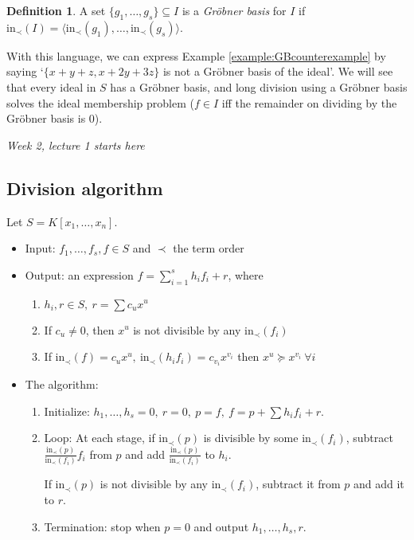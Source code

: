 \documentclass[a4paper]{article}
\newcommand{\In}{\text{in}}
\theoremstyle{definition}
\newtheorem{defn}{Definition}[subsection]
\begin{document}
\begin{defn}
A set $\{g_1,\ldots,g_s\}\subseteq I$ is a \textit{Gröbner basis} for $I$ if $\In_\prec (I)=\langle \In_\prec (g_1),\ldots,\In_\prec (g_s)\rangle$.
\end{defn}
With this language, we can express Example \ref{example:GBcounterexample} by saying `$\{x+y+z,x+2y+3z\}$ is not a Gröbner basis of the ideal'. We will see that every ideal in $S$ has a Gröbner basis, and long division using a Gröbner basis solves the ideal membership problem ($f\in I$ iff the remainder on dividing by the Gröbner basis is 0).

\begin{flushright}
\textit{Week 2, lecture 1 starts here}
\end{flushright}

\subsection{Division algorithm}
Let $S=K[x_1,\ldots,x_n]$.
\begin{itemize}
\item Input: $f_1,\ldots,f_s,f\in S$ and $\prec$ the term order
\item Output: an expression $f=\sum_{i=1}^s h_i f_i+r$, where
\begin{enumerate}
\item $h_i,r\in S,\ r=\sum c_u x^u$
\item If $c_u\neq 0$, then $x^u$ is not divisible by any $\In_\prec (f_i)$
\item If $\In_\prec(f)=c_u x^u,\ \In_\prec(h_i f_i)=c_{v_i}x^{v_i}$ then $x^u\succeq x^{v_i} \ \forall i$
\end{enumerate}
\item The algorithm:\begin{enumerate}
\item Initialize: $h_1,\ldots,h_s=0,\ r=0,\ p=f,\ f=p+\sum h_i f_i+r$.
\item Loop: At each stage, if $\In_\prec(p)$ is divisible by some $\In_\prec(f_i)$, subtract $\frac{\In_\prec(p)}{\In_\prec(f_i)}f_i$ from $p$ and add $\frac{\In_\prec(p)}{\In_\prec(f_i)}$ to $h_i$.

If $\In_\prec(p)$ is not divisible by any $\In_\prec(f_i)$, subtract it from $p$ and add it to $r$.
\item Termination: stop when $p=0$ and output $h_1,\ldots,h_s,r$.
\end{enumerate}
\end{itemize}
\end{document}
